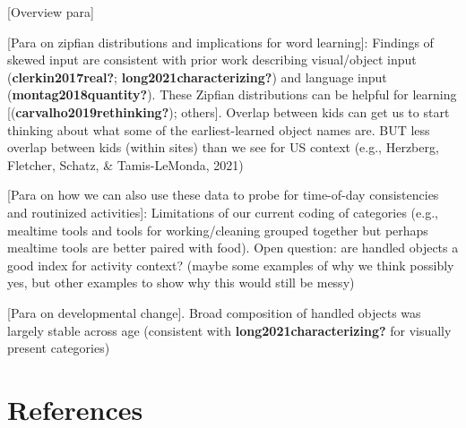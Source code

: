 \documentclass[10pt, letterpaper]{article}
\begin{document}
{[}Overview para{]}

{[}Para on zipfian distributions and implications for word learning{]}:
Findings of skewed input are consistent with prior work describing
visual/object input (\textbf{clerkin2017real?};
\textbf{long2021characterizing?}) and language input
(\textbf{montag2018quantity?}). These Zipfian distributions can be
helpful for learning {[}(\textbf{carvalho2019rethinking?}); others{]}.
Overlap between kids can get us to start thinking about what some of the
earliest-learned object names are. BUT less overlap between kids (within
sites) than we see for US context (e.g., Herzberg, Fletcher, Schatz, \&
Tamis-LeMonda, 2021)

{[}Para on how we can also use these data to probe for time-of-day
consistencies and routinized activities{]}: Limitations of our current
coding of categories (e.g., mealtime tools and tools for
working/cleaning grouped together but perhaps mealtime tools are better
paired with food). Open question: are handled objects a good index for
activity context? (maybe some examples of why we think possibly yes, but
other examples to show why this would still be messy)

{[}Para on developmental change{]}. Broad composition of handled objects
was largely stable across age (consistent with
\textbf{long2021characterizing?} for visually present categories)

\hypertarget{references}{%
\section{References}\label{references}}

\setlength{\parindent}{-0.1in} 
\setlength{\leftskip}{0.125in}

\noindent
\end{document}
